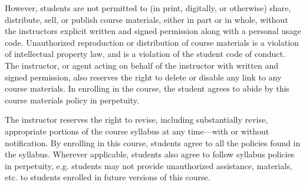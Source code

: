 \documentclass[11pt,letterpaper]{article}
\begin{document}
However, students are not permitted to (in print, digitally, or otherwise) share, distribute, sell, or publish course materials, either in part or in whole, without the instructors explicit written and signed permission along with a personal usage code. Unauthorized reproduction or distribution of course materials is a violation of intellectual property law, and is a violation of the student code of conduct. The instructor, or agent acting on behalf of the instructor with written and signed permission, also reserves the right to delete or disable any link to any course materials. In enrolling in the course, the student agrees to abide by this course materials policy in perpetuity.
\par\vspace{0.75cm}




The instructor reserves the right to revise, including substantially revise, appropriate portions of the course syllabus at any time---with or without notification. By enrolling in this course, students agree to all the policies found in the syllabus. Wherever applicable, students also agree to follow syllabus policies in perpetuity, e.g. students may not provide unauthorized assistance, materials, etc. to students enrolled in future versions of this course. 
\sectionbreak



\end{document}
